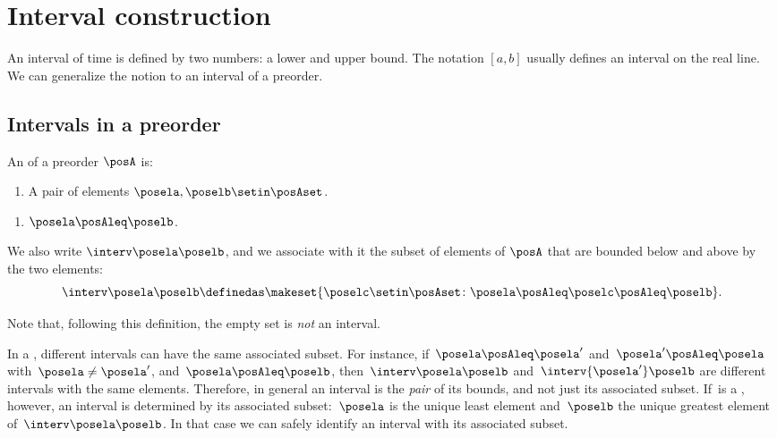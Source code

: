 
\section{Interval construction}

An interval of time is defined by two numbers: a lower and upper bound.
The notation $[a,b]$ usually defines an interval on the real line.
We can generalize the notion to an interval of a preorder.

\subsection{Intervals in a preorder}
\begin{marginfigure}
    \centering
    \caption{Poset interval on $\reals^2$.}
    \label{fig:int_posets}
\end{marginfigure}

\begin{definition}[Interval]
    \label{def:interval}
    An  of a preorder $\posA$ is:

    \constit
    \begin{enumerate}
        \item A pair of elements $\posela, \poselb \setin \posAset$.
    \end{enumerate}

    \condit
    \begin{enumerate}
        \item $\posela \posAleq \poselb$.
    \end{enumerate}
    We also write $\interv \posela \poselb$, and we associate with it the subset of elements of $\posA$ that are bounded below and above by the two elements:
    \begin{equation}\label{eq:interval}
        \interv \posela \poselb
        \definedas
        \makeset{
            \poselc \setin \posAset \colon
            \posela \posAleq \poselc \posAleq \poselb
        }.
    \end{equation}
\end{definition}

Note that, following this definition, the empty set is \emph{not} an interval.

In a , different intervals can have the same associated subset.
For instance, if~$\posela \posAleq \posela'$ and~$\posela' \posAleq \posela$ with~$\posela \neq \posela'$, and~$\posela \posAleq \poselb$, then~$\interv \posela \poselb$ and~$\interv {\posela'} \poselb$ are different intervals with the same elements.
Therefore, in general an interval is the \emph{pair} of its bounds, and not just its associated subset.
If~\posA is a , however, an interval is determined by its associated subset:~$\posela$ is the unique least element and~$\poselb$ the unique greatest element of~$\interv \posela \poselb$.
In that case we can safely identify an interval with its associated subset.


